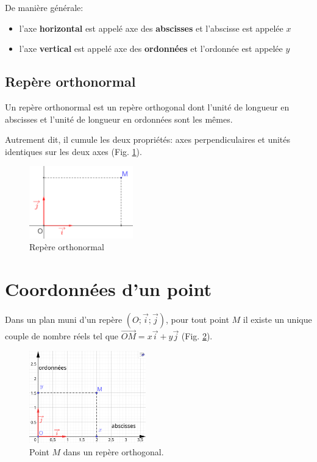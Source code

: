 \documentclass[a4paper,12pt]{scrartcl}
\begin{document}
De manière générale:
\begin{itemize}
\item l'axe \textbf{horizontal} est appelé axe des \textbf{abscisses} et l'abscisse est appelée $x$
\item l'axe \textbf{vertical} est appelé axe des \textbf{ordonnées} et l'ordonnée est appelée $y$
\end{itemize}


\subsection{Repère orthonormal}

Un repère orthonormal est un repère orthogonal dont l'unité de longueur en abscisses et l'unité de longueur en ordonnées sont les mêmes. 

Autrement dit, il cumule les deux propriétés: axes perpendiculaires et unités identiques sur les deux axes (Fig. \ref{RepOrthonormal}). 

\begin{figure}[h]
\begin{center}
\includegraphics[width=0.4\textwidth]{pics/RepereOrthonormal.png}
\end{center}
\caption{Repère orthonormal}
\label{RepOrthonormal}
\end{figure}

\section{Coordonnées d'un point}

Dans un plan muni d'un repère $\left (O;\overrightarrow{i};\overrightarrow{j}\right )$, pour tout point $M$ il existe un unique couple de nombre réels tel que $\overrightarrow{OM} = x \overrightarrow{i} + y \overrightarrow{j}$ (Fig. \ref{JustAPoint}).

\begin{figure}[h]
\begin{center}
\includegraphics[width=0.45\textwidth]{pics/JustAPoint.png}
\end{center}
\caption{Point $M$ dans un repère orthogonal.}
\label{JustAPoint}
\end{figure}
\end{document}
